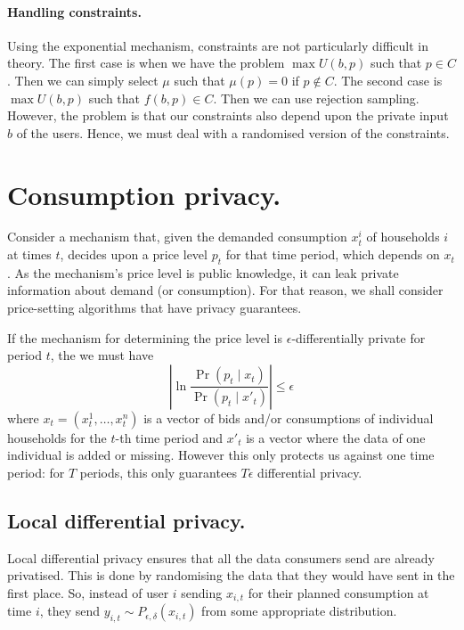 \documentclass[a4paper,onecolumn]{article}
\numberwithin{algorithm}{section}
\theoremstyle{plain}
\theoremstyle{definition}
\theoremstyle{example}
\newcommand{\demand}{x}
\newcommand{\price}{p}
\begin{document}
\paragraph{Handling constraints.}
Using the exponential mechanism, constraints are not particularly
difficult in theory.  The first case is when we have the problem
$\max U(b, p)$ such that $p \in C$. Then we can simply select $\mu$
such that $\mu(p) = 0$ if $p \notin C$.  The second case is
$\max U(b, p)$ such that $f(b, p) \in C$. Then we can use rejection
sampling. However, the problem is that our constraints also depend
upon the private input $b$ of the users. Hence, we must deal with a
randomised version of the constraints. 


\section{Consumption privacy.}

Consider a mechanism that, given the demanded consumption
$\demand_t^i$ of households $i$ at times $t$, decides upon a price
level $\price_{t}$ for that time period, which depends on
$\demand_{t}$. As the mechanism's price level is public knowledge, it
can leak private information about demand (or consumption). For that
reason, we shall consider price-setting algorithms that have privacy
guarantees.

If the mechanism for determining the price level is
$\epsilon$-differentially private for period $t$, the we must have
\[
\left|
  \ln \frac{\Pr(\price_t \mid \demand_t)}{\Pr(\price_t \mid x'_t)}
\right|
 \leq \epsilon
\]
where $\demand_t = (\demand^1_t, \ldots, \demand^n_t)$ is a vector of
bids and/or consumptions of individual households for the $t$-th time
period and $x'_t$ is a vector where the data of one individual is
added or missing.  However this only protects us against one time
period: for $T$ periods, this only guarantees $T \epsilon$
differential privacy.



\subsection{Local differential privacy.}
Local differential privacy ensures that all the data consumers send are already privatised. This is done by randomising the data that they would have sent in the first place. So, instead of user $i$ sending $x_{i,t}$ for their planned consumption at time $i$, they send $y_{i,t} \sim P_{\epsilon, \delta}(x_{i,t})$ from some appropriate distribution.
\end{document}
